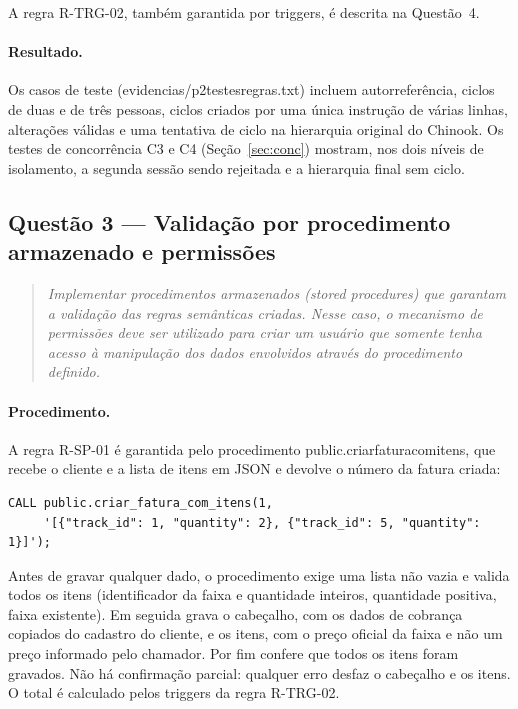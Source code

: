 \documentclass[11pt,a4paper]{article}
\newcommand{\cod}[1]{{\ttfamily\renewcommand{\_}{\textunderscore\allowbreak}#1}}
\newenvironment{enunciado}{\begin{quote}\small\itshape}{\end{quote}}
\begin{document}
A regra R-TRG-02, também garantida por triggers, é descrita na Questão~4.

\paragraph{Resultado.} Os \numCasosH{} casos de teste (\cod{evidencias/p2\_testes\_regras.txt}) incluem autorreferência, ciclos de duas e de três pessoas,
ciclos criados por uma única instrução de várias linhas, alterações válidas e uma tentativa de ciclo na hierarquia
original do Chinook. Os testes de concorrência C3 e C4 (Seção~\ref{sec:conc}) mostram, nos dois níveis de
isolamento, a segunda sessão sendo rejeitada e a hierarquia final sem ciclo.

\subsection{Questão 3 --- Validação por procedimento armazenado e permissões}

\begin{enunciado}
Implementar procedimentos armazenados (stored procedures) que garantam a validação das regras semânticas criadas.
Nesse caso, o mecanismo de permissões deve ser utilizado para criar um usuário que somente tenha acesso à
manipulação dos dados envolvidos através do procedimento definido.
\end{enunciado}

\paragraph{Procedimento.} A regra R-SP-01 é garantida pelo procedimento \cod{public.criar\_fatura\_com\_itens}, que
recebe o cliente e a lista de itens em JSON e devolve o número da fatura criada:

\begin{lstlisting}
CALL public.criar_fatura_com_itens(1,
     '[{"track_id": 1, "quantity": 2}, {"track_id": 5, "quantity": 1}]');
\end{lstlisting}

Antes de gravar qualquer dado, o procedimento exige uma lista não vazia e valida todos os itens (identificador da
faixa e quantidade inteiros, quantidade positiva, faixa existente). Em seguida grava o cabeçalho, com os dados de
cobrança copiados do cadastro do cliente, e os itens, com o preço oficial da faixa e não um preço informado pelo
chamador. Por fim confere que todos os itens foram gravados. Não há confirmação parcial: qualquer erro desfaz o
cabeçalho e os itens. O total é calculado pelos triggers da regra R-TRG-02.
\end{document}
